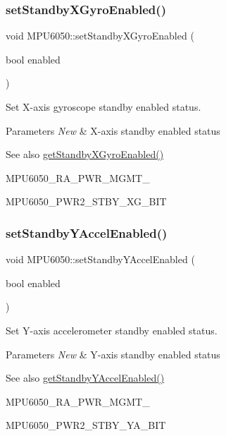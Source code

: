 \subsubsection{\texorpdfstring{setStandbyXGyroEnabled()}{setStandbyXGyroEnabled()}}
{\footnotesize\ttfamily void M\+P\+U6050\+::set\+Standby\+X\+Gyro\+Enabled (\begin{DoxyParamCaption}\item[{bool}]{enabled }\end{DoxyParamCaption})}

Set X-\/axis gyroscope standby enabled status. 
\begin{DoxyParams}{Parameters}
{\em New} & X-\/axis standby enabled status \\
\hline
\end{DoxyParams}
\begin{DoxySeeAlso}{See also}
\mbox{\hyperlink{class_m_p_u6050_acb5fde4167aa54fbbe84706d577a48a6}{get\+Standby\+X\+Gyro\+Enabled()}} 

M\+P\+U6050\+\_\+\+R\+A\+\_\+\+P\+W\+R\+\_\+\+M\+G\+M\+T\+\_ 

M\+P\+U6050\+\_\+\+P\+W\+R2\+\_\+\+S\+T\+B\+Y\+\_\+\+X\+G\+\_\+\+B\+IT 
\end{DoxySeeAlso}
\mbox{\label{class_m_p_u6050_a7ce7d3299479eb66518acf0697132835}} 
\subsubsection{\texorpdfstring{setStandbyYAccelEnabled()}{setStandbyYAccelEnabled()}}
{\footnotesize\ttfamily void M\+P\+U6050\+::set\+Standby\+Y\+Accel\+Enabled (\begin{DoxyParamCaption}\item[{bool}]{enabled }\end{DoxyParamCaption})}

Set Y-\/axis accelerometer standby enabled status. 
\begin{DoxyParams}{Parameters}
{\em New} & Y-\/axis standby enabled status \\
\hline
\end{DoxyParams}
\begin{DoxySeeAlso}{See also}
\mbox{\hyperlink{class_m_p_u6050_a104f2ec438d745f8fdeec202bae09b48}{get\+Standby\+Y\+Accel\+Enabled()}} 

M\+P\+U6050\+\_\+\+R\+A\+\_\+\+P\+W\+R\+\_\+\+M\+G\+M\+T\+\_ 

M\+P\+U6050\+\_\+\+P\+W\+R2\+\_\+\+S\+T\+B\+Y\+\_\+\+Y\+A\+\_\+\+B\+IT 
\end{DoxySeeAlso}
\mbox{\label{class_m_p_u6050_ab0973d64b7132188539b07991f7ea1f0}} 
